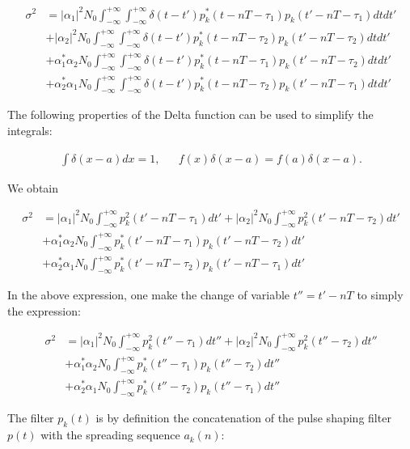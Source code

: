 \documentclass [a4paper, 11pt] {article}
\begin{document}
\begin{solution}
\begin{enumerate}
\begin{align}
\sigma^2 &= |\alpha_1|^2N_0 \int_{-\infty}^{+\infty}\int_{-\infty}^{+\infty}\delta(t-t')p_k^*(t-nT-\tau_{1})p_k(t'-nT-\tau_{1})dtdt' \\
&+ |\alpha_2|^2N_0 \int_{-\infty}^{+\infty}\int_{-\infty}^{+\infty}\delta(t-t')p_k^*(t-nT-\tau_{2})p_k(t'-nT-\tau_{2})dtdt' \nonumber\\
&+ \alpha_1^*\alpha_2N_0 \int_{-\infty}^{+\infty}\int_{-\infty}^{+\infty}\delta(t-t')p_k^*(t-nT-\tau_{1})p_k(t'-nT-\tau_{2})dtdt' \nonumber\\
&+ \alpha_2^*\alpha_1N_0 \int_{-\infty}^{+\infty}\int_{-\infty}^{+\infty}\delta(t-t')p_k^*(t-nT-\tau_{2})p_k(t'-nT-\tau_{1})dtdt'\nonumber
\end{align}


The following properties of the Delta function can be used to simplify the integrals:

\begin{align}
    \int \delta(x-a) dx = 1, &&  f(x)\delta(x-a) = f(a)\delta(x-a).
\end{align}

We obtain

\begin{align}
\sigma^2 &= |\alpha_1|^2N_0 \int_{-\infty}^{+\infty}p_k^2(t'-nT-\tau_{1})dt' + |\alpha_2|^2N_0 \int_{-\infty}^{+\infty}p_k^2(t'-nT-\tau_{2})dt' \\
&+ \alpha_1^*\alpha_2N_0 \int_{-\infty}^{+\infty}p_k^*(t'-nT-\tau_{1})p_k(t'-nT-\tau_{2})dt'\nonumber\\
&+ \alpha_2^*\alpha_1N_0 \int_{-\infty}^{+\infty}p_k^*(t'-nT-\tau_{2})p_k(t'-nT-\tau_{1})dt'\nonumber
\end{align}

In the above expression, one make the change of variable $t''=t'-nT$ to simply the expression:

\begin{align}
\sigma^2 &= |\alpha_1|^2N_0 \int_{-\infty}^{+\infty}p_k^2(t''-\tau_{1})dt'' + |\alpha_2|^2N_0 \int_{-\infty}^{+\infty}p_k^2(t''-\tau_{2})dt'' \\
&+ \alpha_1^*\alpha_2N_0 \int_{-\infty}^{+\infty}p_k^*(t''-\tau_{1})p_k(t''-\tau_{2})dt''\nonumber\\
&+ \alpha_2^*\alpha_1N_0 \int_{-\infty}^{+\infty}p_k^*(t''-\tau_{2})p_k(t''-\tau_{1})dt'' \nonumber
\end{align}

The filter $p_k(t)$ is by definition the concatenation of the pulse shaping filter $p(t)$ with the spreading sequence $a_k(n)$:


\end{enumerate}
\end{solution}
\end{document}
